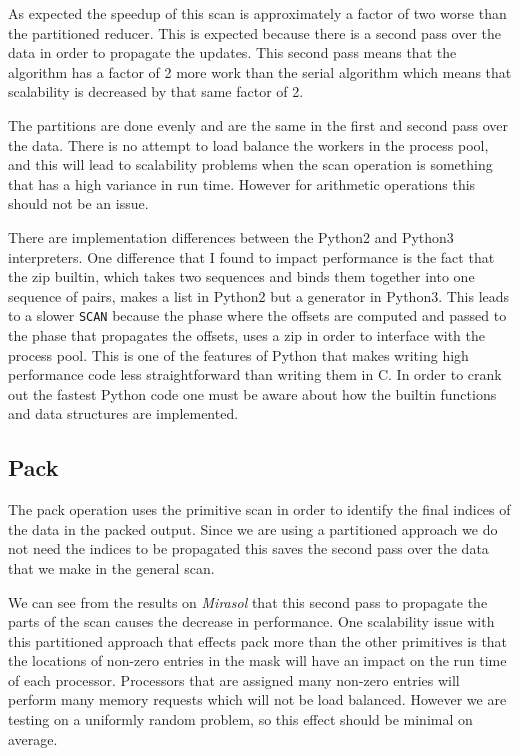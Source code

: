 \documentclass[]{IEEEtran}
\begin{document}
As expected the speedup of this scan is approximately a factor of two
worse than the partitioned reducer. This is expected because there is a
second pass over the data in order to propagate the updates. This second
pass means that the algorithm has a factor of 2 more work than the
serial algorithm which means that scalability is decreased by that same
factor of 2.

The partitions are done evenly and are the same in the first and second
pass over the data. There is no attempt to load balance the workers in
the process pool, and this will lead to scalability problems when the
scan operation is something that has a high variance in run time.
However for arithmetic operations this should not be an issue.

There are implementation differences between the Python2 and Python3
interpreters. One difference that I found to impact performance is the
fact that the zip builtin, which takes two sequences and binds them
together into one sequence of pairs, makes a list in Python2 but a
generator in Python3. This leads to a slower \texttt{SCAN} because the
phase where the offsets are computed and passed to the phase that
propagates the offsets, uses a zip in order to interface with the
process pool. This is one of the features of Python that makes writing
high performance code less straightforward than writing them in C. In
order to crank out the fastest Python code one must be aware about how
the builtin functions and data structures are implemented.

\subsection{Pack}

The pack operation uses the primitive scan in order to identify the
final indices of the data in the packed output. Since we are using a
partitioned approach we do not need the indices to be propagated this
saves the second pass over the data that we make in the general scan.

We can see from the results on \emph{Mirasol} that this second pass to
propagate the parts of the scan causes the decrease in performance. One
scalability issue with this partitioned approach that effects pack more
than the other primitives is that the locations of non-zero entries in
the mask will have an impact on the run time of each processor.
Processors that are assigned many non-zero entries will perform many
memory requests which will not be load balanced. However we are testing
on a uniformly random problem, so this effect should be minimal on
average.
\end{document}
